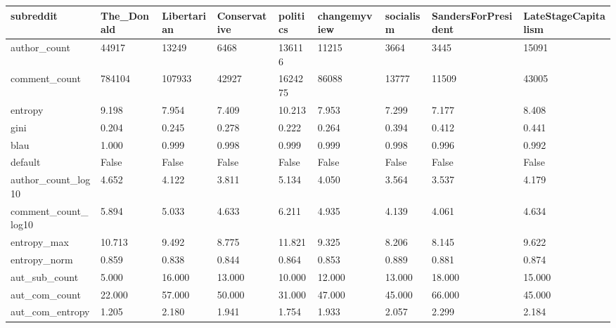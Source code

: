 \begin{table}
\centering
\begin{tabular}{lllllllll}
\toprule
subreddit & The\_Donald & Libertarian & Conservative & politics & changemyview & socialism & SandersForPresident & LateStageCapitalism \\
\midrule
author\_count        &      44917 &       13249 &         6468 &   136116 &        11215 &      3664 &                3445 &               15091 \\
comment\_count       &     784104 &      107933 &        42927 &  1624275 &        86088 &     13777 &               11509 &               43005 \\
entropy             &      9.198 &       7.954 &        7.409 &   10.213 &        7.953 &     7.299 &               7.177 &               8.408 \\
gini                &      0.204 &       0.245 &        0.278 &    0.222 &        0.264 &     0.394 &               0.412 &               0.441 \\
blau                &      1.000 &       0.999 &        0.998 &    0.999 &        0.999 &     0.998 &               0.996 &               0.992 \\
default             &      False &       False &        False &    False &        False &     False &               False &               False \\
author\_count\_log10  &      4.652 &       4.122 &        3.811 &    5.134 &        4.050 &     3.564 &               3.537 &               4.179 \\
comment\_count\_log10 &      5.894 &       5.033 &        4.633 &    6.211 &        4.935 &     4.139 &               4.061 &               4.634 \\
entropy\_max         &     10.713 &       9.492 &        8.775 &   11.821 &        9.325 &     8.206 &               8.145 &               9.622 \\
entropy\_norm        &      0.859 &       0.838 &        0.844 &    0.864 &        0.853 &     0.889 &               0.881 &               0.874 \\
aut\_sub\_count       &      5.000 &      16.000 &       13.000 &   10.000 &       12.000 &    13.000 &              18.000 &              15.000 \\
aut\_com\_count       &     22.000 &      57.000 &       50.000 &   31.000 &       47.000 &    45.000 &              66.000 &              45.000 \\
aut\_com\_entropy     &      1.205 &       2.180 &        1.941 &    1.754 &        1.933 &     2.057 &               2.299 &               2.184 \\

\end{tabular}
\end{table}
